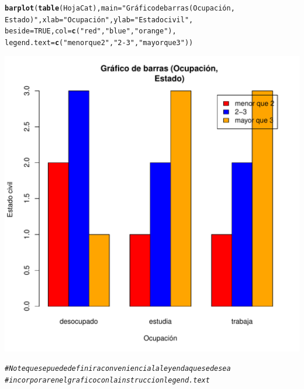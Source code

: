 \documentclass[12pt,letterpaper]{article}\usepackage[]{graphicx}\usepackage[]{color}
\makeatletter
\def\maxwidth{ %
  \ifdim\Gin@nat@width>\linewidth
    \linewidth
  \else
    \Gin@nat@width
  \fi
}
\newcommand{\hlnum}[1]{\textcolor[rgb]{0.686,0.059,0.569}{#1}}%
\newcommand{\hlstr}[1]{\textcolor[rgb]{0.192,0.494,0.8}{#1}}%
\newcommand{\hlcom}[1]{\textcolor[rgb]{0.678,0.584,0.686}{\textit{#1}}}%
\newcommand{\hlstd}[1]{\textcolor[rgb]{0.345,0.345,0.345}{#1}}%
\newcommand{\hlkwc}[1]{\textcolor[rgb]{0.333,0.667,0.333}{#1}}%
\newcommand{\hlkwd}[1]{\textcolor[rgb]{0.737,0.353,0.396}{\textbf{#1}}}%
\newenvironment{kframe}{%
 \def\at@end@of@kframe{}%
 \ifinner\ifhmode%
  \def\at@end@of@kframe{\end{minipage}}%
  \begin{minipage}{\columnwidth}%
 \fi\fi%
 \def\FrameCommand##1{\hskip\@totalleftmargin \hskip-\fboxsep
 \colorbox{shadecolor}{##1}\hskip-\fboxsep
     \hskip-\linewidth \hskip-\@totalleftmargin \hskip\columnwidth}%
 \MakeFramed {\advance\hsize-\width
   \@totalleftmargin\z@ \linewidth\hsize
   \@setminipage}}%
 {\par\unskip\endMakeFramed%
 \at@end@of@kframe}
\newenvironment{knitrout}{}{} %
\makeatother
\begin{document}
\begin{enumerate}
\begin{knitrout}
\color{fgcolor}\begin{kframe}
\begin{alltt}
\hlkwd{barplot}\hlstd{(}\hlkwd{table}\hlstd{(HojaCat),} \hlkwc{main}\hlstd{=}\hlstr{"Gráfico de barras (Ocupación, 
        Estado)"}\hlstd{,} \hlkwc{xlab}\hlstd{=}\hlstr{"Ocupación"}\hlstd{,} \hlkwc{ylab}\hlstd{=}\hlstr{"Estado civil"}\hlstd{,}
        \hlkwc{beside}\hlstd{=}\hlnum{TRUE}\hlstd{,}\hlkwc{col}\hlstd{=}\hlkwd{c}\hlstd{(}\hlstr{"red"}\hlstd{,} \hlstr{"blue"}\hlstd{,} \hlstr{"orange"}\hlstd{),}
        \hlkwc{legend.text}\hlstd{=}\hlkwd{c}\hlstd{(}\hlstr{"menor que 2"}\hlstd{,} \hlstr{"2-3"}\hlstd{,} \hlstr{"mayor que 3"}\hlstd{))}
\end{alltt}
\end{kframe}
\includegraphics[width=\maxwidth]{figure/unnamed-chunk-20-1} 
\begin{kframe}\begin{alltt}
\hlcom{# Note que se puede definir a conveniencia la leyenda que se desea}
\hlcom{# incorporar en el grafico con la instruccion legend.text }
\end{alltt}
\end{kframe}
\end{knitrout}


\end{enumerate}
\end{document}
